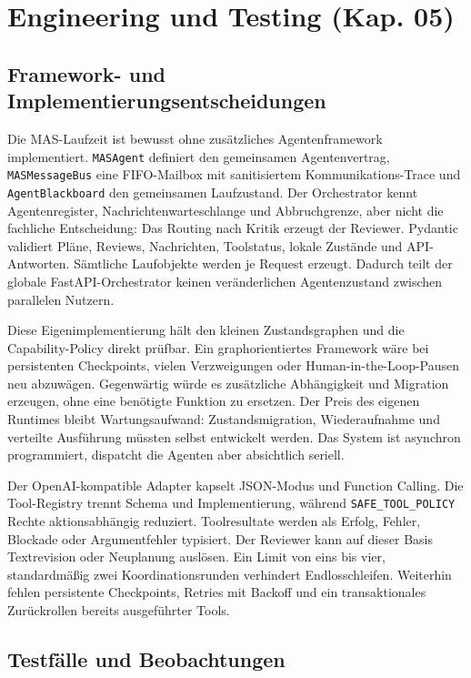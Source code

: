 \section{Engineering und Testing (Kap. 05)}
\label{sec:engineering-testing}

\subsection{Framework- und Implementierungsentscheidungen}

Die MAS-Laufzeit ist bewusst ohne zusätzliches Agentenframework implementiert.
\texttt{MASAgent} definiert den gemeinsamen Agentenvertrag,
\texttt{MASMessageBus} eine FIFO-Mailbox mit sanitisiertem Kommunikations-Trace
und \texttt{AgentBlackboard} den gemeinsamen Laufzustand. Der Orchestrator
kennt Agentenregister, Nachrichtenwarteschlange und Abbruchgrenze, aber nicht
die fachliche Entscheidung: Das Routing nach Kritik erzeugt der Reviewer.
Pydantic validiert Pläne, Reviews, Nachrichten, Toolstatus, lokale Zustände und
API-Antworten. Sämtliche Laufobjekte werden je Request erzeugt. Dadurch teilt
der globale FastAPI-Orchestrator keinen veränderlichen Agentenzustand zwischen
parallelen Nutzern.

Diese Eigenimplementierung hält den kleinen Zustandsgraphen und die
Capability-Policy direkt prüfbar. Ein graphorientiertes Framework wäre bei
persistenten Checkpoints, vielen Verzweigungen oder Human-in-the-Loop-Pausen
neu abzuwägen. Gegenwärtig würde es zusätzliche Abhängigkeit und Migration
erzeugen, ohne eine benötigte Funktion zu ersetzen. Der Preis des eigenen
Runtimes bleibt Wartungsaufwand: Zustandsmigration, Wiederaufnahme und
verteilte Ausführung müssten selbst entwickelt werden. Das System ist
asynchron programmiert, dispatcht die Agenten aber absichtlich seriell.

Der OpenAI-kompatible Adapter kapselt JSON-Modus und Function Calling. Die
Tool-Registry trennt Schema und Implementierung, während
\texttt{SAFE\_TOOL\_POLICY} Rechte aktionsabhängig reduziert. Toolresultate
werden als Erfolg, Fehler, Blockade oder Argumentfehler typisiert. Der Reviewer
kann auf dieser Basis Textrevision oder Neuplanung auslösen. Ein Limit von eins
bis vier, standardmäßig zwei Koordinationsrunden verhindert Endlosschleifen.
Weiterhin fehlen persistente Checkpoints, Retries mit Backoff und ein
transaktionales Zurückrollen bereits ausgeführter Tools.

\subsection{Testfälle und Beobachtungen}


